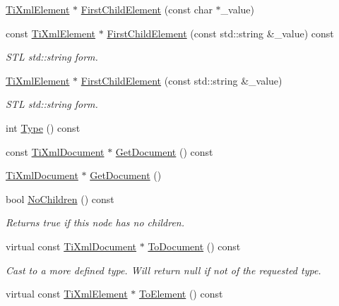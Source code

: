 \begin{DoxyCompactItemize}
\hyperlink{class_ti_xml_element}{Ti\+Xml\+Element} $\ast$ \hyperlink{class_ti_xml_node_a6936ae323675071808ac4840379e57f5}{First\+Child\+Element} (const char $\ast$\+\_\+value)
\item 
const \hyperlink{class_ti_xml_element}{Ti\+Xml\+Element} $\ast$ \hyperlink{class_ti_xml_node_abfe4a2abe61324def87fe421946f9df9}{First\+Child\+Element} (const std\+::string \&\+\_\+value) const
\begin{DoxyCompactList}\small\item\em S\+TL std\+::string form. \end{DoxyCompactList}\item 
\hyperlink{class_ti_xml_element}{Ti\+Xml\+Element} $\ast$ \hyperlink{class_ti_xml_node_a7f1d7291880534c1e5cdeb392d8c1f45}{First\+Child\+Element} (const std\+::string \&\+\_\+value)
\begin{DoxyCompactList}\small\item\em S\+TL std\+::string form. \end{DoxyCompactList}\item 
int \hyperlink{class_ti_xml_node_a0f4dd916b2afc2ab2f1a84f3e2b8fd5d}{Type} () const
\item 
const \hyperlink{class_ti_xml_document}{Ti\+Xml\+Document} $\ast$ \hyperlink{class_ti_xml_node_adcb070acefcbaedaa0673d82e530538b}{Get\+Document} () const
\item 
\hyperlink{class_ti_xml_document}{Ti\+Xml\+Document} $\ast$ \hyperlink{class_ti_xml_node_a7b2372c0e7adfb32f5b6902fe49a39b2}{Get\+Document} ()
\item 
bool \hyperlink{class_ti_xml_node_abe85e0ec04ea59c033f324c8504653e5}{No\+Children} () const
\begin{DoxyCompactList}\small\item\em Returns true if this node has no children. \end{DoxyCompactList}\item 
virtual const \hyperlink{class_ti_xml_document}{Ti\+Xml\+Document} $\ast$ \hyperlink{class_ti_xml_node_a775a904618cad6e4a8049bda4f5a6aa9}{To\+Document} () const
\begin{DoxyCompactList}\small\item\em Cast to a more defined type. Will return null if not of the requested type. \end{DoxyCompactList}\item 
virtual const \hyperlink{class_ti_xml_element}{Ti\+Xml\+Element} $\ast$ \hyperlink{class_ti_xml_node_a4080428f2cac46e92ef4d284202fad0b}{To\+Element} () const

\end{DoxyCompactItemize}
